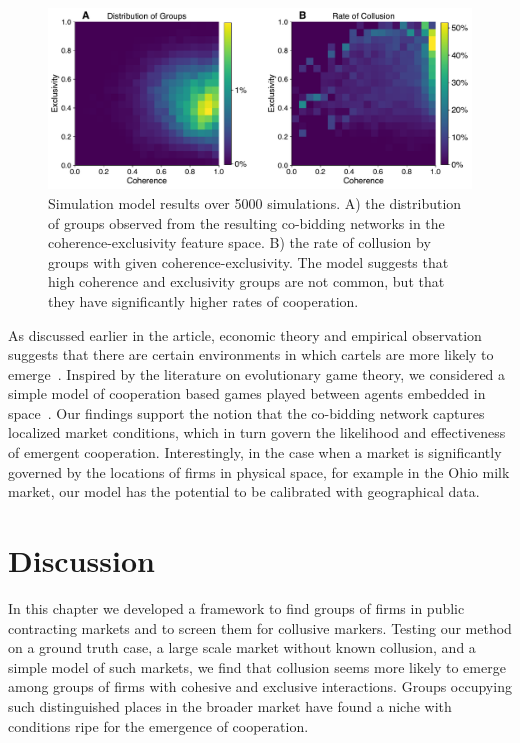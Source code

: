 \begin{figure}[t]
\includegraphics[width=\textwidth]{images/cartels/simulation_results.pdf}
\caption[Simulation model coherence and exclusivity distributions.]{Simulation model results over 5000 simulations. A) the distribution of groups observed from the resulting co-bidding networks in the coherence-exclusivity feature space. B) the rate of collusion by groups with given coherence-exclusivity. The model suggests that high coherence and exclusivity groups are not common, but that they have significantly higher rates of cooperation.}
\label{fig:simulation_model}
\end{figure}

As discussed earlier in the article, economic theory and empirical observation suggests that there are certain environments in which cartels are more likely to emerge~\cite{levenstein2006determines}. Inspired by the literature on evolutionary game theory, we considered a simple model of cooperation based games played between agents embedded in space~\cite{szamado2008effect}. Our findings support the notion that the co-bidding network captures localized market conditions, which in turn govern the likelihood and effectiveness of emergent cooperation. Interestingly, in the case when a market is significantly governed by the locations of firms in physical space, for example in the Ohio milk market, our model has the potential to be calibrated with geographical data.



\section{Discussion}
In this chapter we developed a framework to find groups of firms in public contracting markets and to screen them for collusive markers. Testing our method on a ground truth case, a large scale market without known collusion, and a simple model of such markets, we find that collusion seems more likely to emerge among groups of firms with cohesive and exclusive interactions. Groups occupying such distinguished places in the broader market have found a niche with conditions ripe for the emergence of cooperation.

